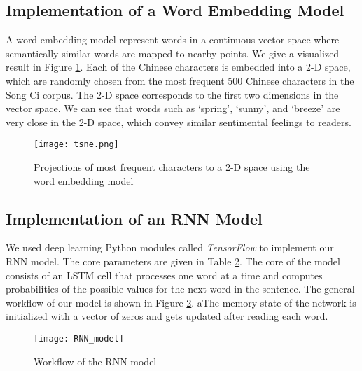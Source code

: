 \subsection{Implementation of a Word Embedding Model }
A word embedding model represent words in a continuous vector space where semantically similar words are mapped to nearby points.
%
%
We give a visualized result in Figure \ref{fig:VSM}. 
%
Each of the Chinese characters is embedded into a 2-D space, which are randomly chosen from the most frequent 500 Chinese characters in the Song Ci corpus. The 2-D space corresponds to the first two dimensions in the vector space. We can see that words such as `spring', `sunny', and `breeze' are very close in the 2-D space, which convey similar sentimental feelings to readers.

\begin{figure}[htbp]
	\centering
	\texttt{[image: tsne.png]}
	\caption{Projections of most frequent characters to a 2-D space using the word embedding model}
	\label{fig:VSM}
\end{figure}


\subsection{Implementation of an RNN Model} 
%
We used deep learning Python modules called \emph{TensorFlow} \cite{tensorflow} to implement our RNN model. The core parameters are given in Table \ref{fig:rnn_workflow}.
%
The core of the model consists of an LSTM cell that processes one word at a time and computes probabilities of the possible values for the next word in the sentence. 
%
The general workflow of our model is shown in Figure \ref{fig:rnn_workflow}.
%
aThe memory state of the network is initialized with a vector of zeros and gets updated after reading each word. 



\begin{figure}[htbp]
	\centering
	\texttt{[image: RNN\_model]}
	\caption{Workflow of the RNN model}
	\label{fig:rnn_workflow}
\end{figure}

